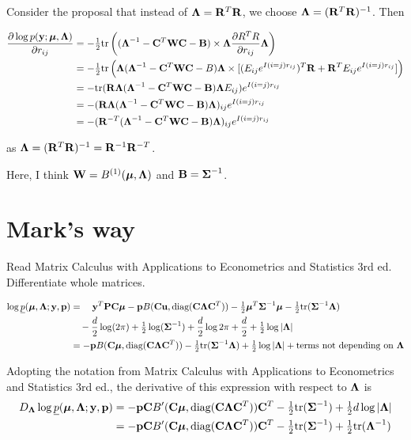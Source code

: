 \documentclass{article}[12pt]
\begin{document}
\noindent Consider the proposal that instead of ${\boldsymbol \Lambda} = {\bf R}^T {\bf R}$, we choose
${\boldsymbol \Lambda} = ({\bf R}^T {\bf R})^{-1}$. Then

\begin{align*}
	\frac{\partial \log p({\bf y}; {\boldsymbol \mu}, {\boldsymbol \Lambda})}{\partial r_{ij}} &= - \tfrac{1}{2} \text{tr} \left( ({\boldsymbol \Lambda}^{-1} - {\bf C}^T {\bf W} {\bf C} - {\bf B}) \times {\boldsymbol\Lambda} \frac{\partial R^T R}{\partial r_{ij}} {\boldsymbol \Lambda} \right) \\
	&= - \tfrac{1}{2} \text{tr} \left( {\boldsymbol \Lambda}({\boldsymbol \Lambda}^{-1} - {\bf C}^T{\bf W}{\bf C} - B){\boldsymbol \Lambda} \times [(E_{ij} e^{I(i=j)r_{ij}})^T {\bf R} + {\bf R}^T E_{ij} e^{I(i=j) r_{ij}}] \right) \\
	&= - \text{tr} ({\bf R} {\boldsymbol \Lambda} ({\boldsymbol \Lambda}^{-1} - {\bf C}^T {\bf W} {\bf C} - {\bf B}) {\boldsymbol \Lambda} E_{ij})e^{I(i=j) r_{ij}} \\
	&= - ({\bf R} {\boldsymbol \Lambda} ({\boldsymbol \Lambda}^{-1} - {\bf C}^T {\bf W} {\bf C} - {\bf B}) {\boldsymbol \Lambda})_{ij} e^{I(i=j) r_{ij}} \\
	&= - ({\bf R}^{-T} ({\boldsymbol \Lambda}^{-1} - {\bf C}^T {\bf W} {\bf C} - {\bf B}) {\boldsymbol \Lambda})_{ij} e^{I(i=j) r_{ij}}
\end{align*}

\noindent as ${\boldsymbol \Lambda} = ({\bf R}^T {\bf R})^{-1} = {\bf R}^{-1} {\bf R}^{-T}$.

\noindent Here, I think ${\bf W} = B^{(1)}({\boldsymbol \mu}, {\boldsymbol \Lambda})$ and ${\bf B} = {\boldsymbol \Sigma}^{-1}$.

\section{Mark's way}

Read Matrix Calculus with Applications to Econometrics and 
Statistics 3rd ed. Differentiate whole matrices.

\begin{align*}
	\log \underline{p}({\boldsymbol \mu}, {\boldsymbol \Lambda}; {\bf y}, {\bf p}) &= \quad {\bf y}^T {\bf P} {\bf C} {\boldsymbol \mu} - {\bf p} B({\bf C} {\bf u}, \text{diag}{({\bf C}{\boldsymbol\Lambda}{\bf C}^T)}) - \tfrac{1}{2} {\boldsymbol \mu}^T {\boldsymbol \Sigma}^{-1} {\boldsymbol \mu} - \tfrac{1}{2} \text{tr}{({\boldsymbol\Sigma}^{-1} {\boldsymbol\Lambda})} \\
	&\quad - \frac{d}{2} \log(2 \pi) + \tfrac{1}{2} \log({\boldsymbol \Sigma}^{-1}) + \frac{d}{2} \log{2 \pi} + \frac{d}{2} + \tfrac{1}{2} \log |{\boldsymbol \Lambda}| \\
	&= -{\bf p} B({\bf C} {\boldsymbol \mu}, \text{diag}{({\bf C}{\boldsymbol\Lambda}{\bf C}^T)}) - \tfrac{1}{2} \text{tr}{({\boldsymbol\Sigma}^{-1} {\boldsymbol\Lambda})} + \tfrac{1}{2} \log |{\boldsymbol \Lambda}| + \text{terms not depending on ${\boldsymbol \Lambda}$}
\end{align*}

\noindent Adopting the notation from Matrix Calculus with Applications to Econometrics and 
Statistics 3rd ed., the derivative of this expression with respect to ${\boldsymbol \Lambda}$ is
\begin{align*}
	D_{\boldsymbol \Lambda} \log \underline{p}({\boldsymbol \mu}, {\boldsymbol \Lambda}; {\bf y}, {\bf p}) &= -{\bf p} {\bf C} B'({\bf C} {\boldsymbol \mu}, \text{diag}{({\bf C}{\boldsymbol\Lambda}{\bf C}^T)}) {\bf C}^T - \tfrac{1}{2} \text{tr}{({\boldsymbol\Sigma}^{-1})} + \tfrac{1}{2} d \log |{\boldsymbol \Lambda}| \\
	 &=-{\bf p} {\bf C} B'({\bf C} {\boldsymbol \mu}, \text{diag}{({\bf C}{\boldsymbol\Lambda}{\bf C}^T)}) {\bf C}^T - \tfrac{1}{2} \text{tr}{({\boldsymbol\Sigma}^{-1})} + \tfrac{1}{2} \text{tr}{({\boldsymbol\Lambda}^{-1})}
\end{align*}
\end{document}
